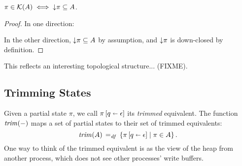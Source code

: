 \documentclass[11pt]{report}
\begin{document}
\begin{lemma}
	\label{lem:kernel-downset}
	$\pi \in \mathcal{K}(A) \iff \operatorname{\downarrow}\!\pi \subseteq A$. 
\end{lemma}

\begin{proof}
	In one direction: 
	
	In the other direction, $\operatorname{\downarrow}\!\pi \subseteq A$ by assumption, and $\operatorname{\downarrow}\!\pi$ is down-closed by definition. 
	
\end{proof}

\begin{note}
	This reflects an interesting topological structure... (FIXME).
\end{note}
	
	
\subsection{Trimming States}

Given a partial state $\pi$, we call $\pi \left[ q \shortleftarrow \epsilon \right]$ its \emph{trimmed} equivalent. The function $\operatorname{\mathit{trim}}(-)$ maps a set of partial states to their set of trimmed equivalents: \[ \operatorname{\mathit{trim}}(A) \operatorname{\;=_{\mathit{df}}\;} \left\lbrace \pi \left[ q \shortleftarrow \epsilon \right] \mid \pi \in A \right\rbrace. \] One way to think of the trimmed equivalent is as the view of the heap from another process, which does not see other processes' write buffers. 
\end{document}
